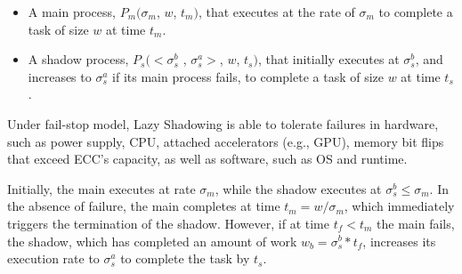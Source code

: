 \begin{itemize}
	\item A main process, $P_m(\sigma_m$, $w$, $t_m)$, that executes at the rate of $\sigma_m$ to complete a task of size $w$ at time $t_m$.
	\item A shadow process, $P_s(<\sigma_s^b$ , $\sigma_s^a>$, $w$, $t_s)$, that initially executes at $\sigma_s^b$, and increases to $\sigma_s^a$ if its main process fails, to complete a task of size $w$ at time $t_s$.%
\end{itemize}

Under fail-stop model, Lazy Shadowing is able to tolerate failures in hardware, such as power supply, CPU, attached accelerators (e.g., GPU), memory bit flips that exceed ECC's capacity, as well as software, such as OS and runtime. 



Initially, the main executes at rate $\sigma_m$, while the shadow executes at $\sigma_s^b \le \sigma_m$. %
In the absence of failure, the main completes at time 
$t_m = w/\sigma_m$, which immediately triggers the termination of the
shadow. However, if at time $t_f < t_m$ the main fails, the shadow, which has completed an amount of work $w_b=\sigma_s^b * t_f$, increases its execution rate to $\sigma_s^a$ to complete the task by $t_s$. %

